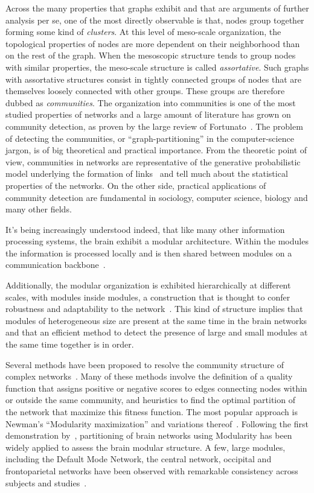 Across the many properties that graphs exhibit and that are arguments of further analysis per se, one of the most directly observable is that, nodes group together forming some kind of \emph{clusters}.
At this level of meso-scale organization, the topological properties of nodes are more dependent on their neighborhood than on the rest of the graph. When the mesoscopic structure tends to group nodes with similar properties, the meso-scale structure is called \emph{assortative}. Such graphs with assortative structures consist in tightly connected groups of nodes that are themselves loosely connected with other groups. These groups are therefore dubbed as \emph{communities}. 
\bigbreak
The organization into communities is one of the most studied properties of networks and a large amount of literature has grown on community detection, as proven by the large review of Fortunato~\cite{fortunato2010}.
The problem of detecting the communities, or ``graph-partitioning'' in the computer-science jargon, is of big theoretical and practical importance.
From the theoretic point of view, communities in networks are representative of the generative probabilistic model underlying the formation of links~\cite{Karrer2011} and tell much about the statistical properties of the networks.
On the other side, practical applications of community detection are fundamental in sociology, computer science, biology and many other fields.

It's being increasingly understood indeed, that like many other information processing systems, the brain exhibit a modular architecture.
Within the modules the information is processed locally and is then shared between modules on a communication backbone~\cite{DeReus2013a,VandenHeuvel2013a}.

Additionally, the modular organization is exhibited hierarchically at different scales, with modules inside modules, a construction that is thought to confer robustness and adaptability to the network~\cite{meunier2010}. This kind of structure implies that modules of heterogeneous size are present at the same time in the brain networks and that an efficient method to detect the presence of large and small modules at the same time together is in order.

Several methods have been proposed to resolve the community structure of complex networks~\cite{fortunato2010,lancichinetti2009}.
Many of these methods involve the definition of a quality function that assigns positive or negative scores to edges connecting nodes within or outside the same community, and heuristics to find the optimal partition of the network that maximize this fitness function. The most popular approach is Newman's ``Modularity maximization'' and variations thereof~\cite{newman2006}.
Following the first demonstration by~\cite{schwarz2008}, partitioning of brain networks using Modularity has been widely applied to assess the brain modular structure.
A few, large modules, including the Default Mode Network, the central network, occipital and frontoparietal networks have been observed with remarkable consistency across subjects and studies~\cite{meunier2010,wang2010}. 

